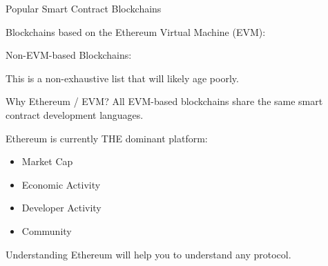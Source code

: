 \documentclass[handout]{beamer}
\begin{document}
\begin{frame}{Popular Smart Contract Blockchains}

Blockchains based on the Ethereum Virtual Machine (EVM):

\vspace{0.2em}

\begin{center}
\begin{tikzpicture}[scale=1, every node/.style={scale=1}]
	
\end{tikzpicture}
\end{center}

\vspace{1em}



Non-EVM-based Blockchains:

\vspace{0.2em}

\begin{center}
\begin{tikzpicture}[scale=1, every node/.style={scale=1}]
	
\end{tikzpicture}
\end{center}

\vspace{1em}
This is a non-exhaustive list that will likely age poorly.

\end{frame}

\begin{frame}{Why Ethereum / EVM?}
	All EVM-based blockchains share the same smart contract development languages.
	
	\vspace{1 em}
	
	Ethereum is currently THE dominant platform:
	\begin{itemize}
		\item Market Cap
		\item Economic Activity
		\item Developer Activity
		\item Community
	\end{itemize}
	\vspace{1 em}
	Understanding Ethereum will help you to understand any protocol.
\end{frame}

\end{document}

